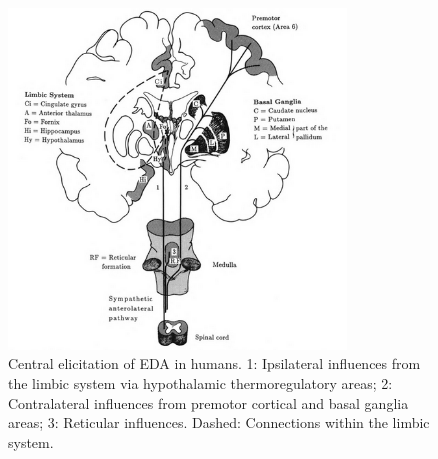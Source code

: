 \begin{figure}[ht]
\centering
\includegraphics[width=0.8\textwidth]{images/zns.png}
\caption{Central elicitation of EDA in humans. 1: Ipsilateral influences from the limbic system via hypothalamic thermoregulatory areas; 2: Contralateral influences from premotor cortical and basal ganglia areas; 3: Reticular influences. Dashed: Connections within the limbic system.}
\label{znsImg}
\end{figure}

